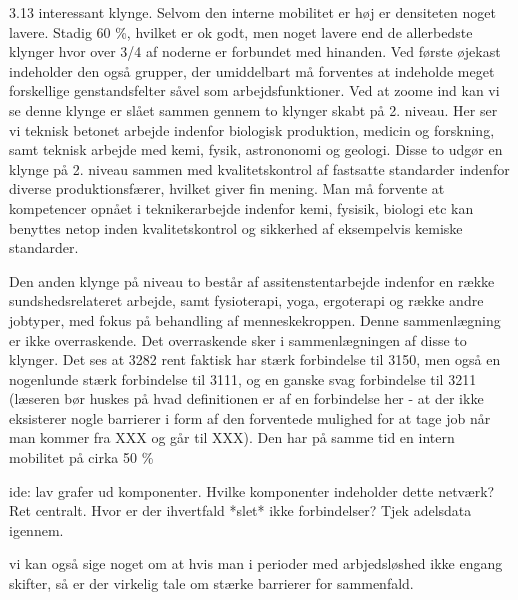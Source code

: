 3.13
interessant klynge. Selvom den interne mobilitet er høj er densiteten noget lavere. Stadig 60 \%, hvilket er ok godt, men noget lavere end de allerbedste klynger hvor over 3/4 af noderne er forbundet med hinanden. Ved første øjekast indeholder den også grupper, der umiddelbart må forventes at indeholde meget forskellige genstandsfelter såvel som arbejdsfunktioner. Ved at zoome ind kan vi se denne klynge er slået sammen gennem to klynger skabt på 2. niveau. Her ser vi teknisk betonet arbejde indenfor biologisk produktion, medicin og forskning, samt teknisk arbejde med kemi, fysik, astrononomi og geologi. Disse to udgør en klynge på 2. niveau sammen med  kvalitetskontrol af fastsatte standarder indenfor diverse produktionsfærer, hvilket giver fin mening. Man må forvente at kompetencer opnået i teknikerarbejde indenfor kemi, fysisik, biologi etc kan benyttes netop inden kvalitetskontrol og sikkerhed af eksempelvis kemiske standarder.

Den anden klynge på niveau to består af assitenstentarbejde indenfor en række sundshedsrelateret arbejde, samt fysioterapi, yoga, ergoterapi og række andre jobtyper, med fokus på behandling af menneskekroppen. Denne sammenlægning er ikke overraskende. Det overraskende sker i sammenlægningen af disse to klynger. Det ses at 3282 rent faktisk har stærk forbindelse til 3150, men også en nogenlunde stærk forbindelse til 3111, og en ganske svag forbindelse til 3211 (læseren bør huskes på hvad definitionen er af en forbindelse her - at der ikke eksisterer nogle barrierer i form af den forventede mulighed for at tage job når man kommer fra XXX og går til XXX). Den har på samme tid en intern mobilitet på cirka 50 \% 








ide: lav grafer ud komponenter. Hvilke komponenter indeholder dette netværk? Ret centralt. Hvor er der ihvertfald *slet* ikke forbindelser? Tjek adelsdata igennem.









vi kan også sige noget om at hvis man i perioder med arbjedsløshed ikke engang skifter, så er der virkelig tale om stærke barrierer for sammenfald.









